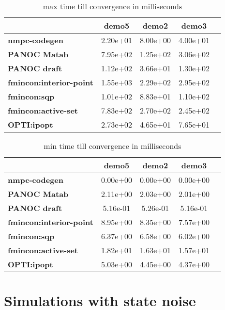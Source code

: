 \begin{table}[H]
	\centering
	\begin{tabular}{|l|c|c|c|c|}
		\hline
		&\textbf{demo5}&\textbf{demo2}&\textbf{demo3}\\\hline
		\textbf{nmpc-codegen}&2.20e+01&8.00e+00&4.00e+01\\\hline
		\textbf{PANOC Matab}&7.95e+02&1.25e+02&3.06e+02\\\hline
		\textbf{PANOC draft}&1.12e+02&3.66e+01&1.30e+02\\\hline
		\textbf{fmincon:interior-point}&1.55e+03&2.29e+02&2.95e+02\\\hline
		\textbf{fmincon:sqp}&1.01e+02&8.83e+01&1.10e+02\\\hline
		\textbf{fmincon:active-set}&7.83e+02&2.70e+02&2.45e+02\\\hline
		\textbf{OPTI:ipopt}&2.73e+02&4.65e+01&7.65e+01\\\hline
	\end{tabular}
	\caption{max time till convergence in milliseconds}
	\label{tbl:max time till convergence}
\end{table}

\begin{table}[H]
	\centering
	\begin{tabular}{|l|	c|c|c|c|}
		\hline
		&\textbf{demo5}&\textbf{demo2}&\textbf{demo3}\\\hline
		\textbf{nmpc-codegen}&0.00e+00&0.00e+00&0.00e+00\\\hline
		\textbf{PANOC Matab}&2.11e+00&2.03e+00&2.01e+00\\\hline
		\textbf{PANOC draft}&5.16e-01&5.26e-01&5.16e-01\\\hline
		\textbf{fmincon:interior-point}&8.95e+00&8.35e+00&7.57e+00\\\hline
		\textbf{fmincon:sqp}&6.37e+00&6.58e+00&6.02e+00\\\hline
		\textbf{fmincon:active-set}&1.82e+01&1.63e+01&1.57e+01\\\hline
		\textbf{OPTI:ipopt}&5.03e+00&4.45e+00&4.37e+00\\\hline
	\end{tabular}
	\caption{min time till convergence in milliseconds}
	\label{tbl:min time till convergence}
\end{table}


\section{Simulations with state noise}
\label{appendix:benchmarks trailer with noise}

